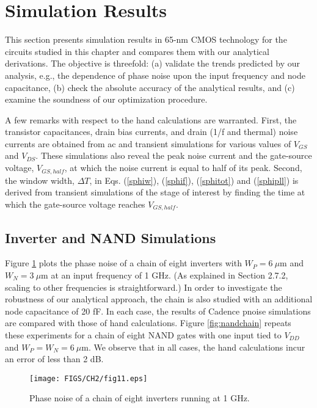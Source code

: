 \section{Simulation Results}
This section presents simulation results in 65-nm CMOS technology for the circuits studied in this chapter and compares them with our
analytical derivations. The objective is threefold: (a) validate the trends
predicted by our analysis, e.g., the dependence of phase noise upon the input frequency and node capacitance, (b) check the absolute accuracy
of the analytical results, and (c) examine the soundness of our optimization procedure.

A few remarks with respect to the hand calculations are warranted. First, the transistor capacitances, drain bias currents, and drain (1/f and
thermal) noise currents are obtained from ac and transient simulations for various values of $V_{GS}$ and $V_{DS}$. These simulations also reveal the peak
noise current and the gate-source voltage, $V_{GS,half}$, at which the noise current is equal to half of its peak. Second, the window width,
$\Delta T$, in Eqs. (\ref{sphiw}), (\ref{sphif}), (\ref{sphitot}) and (\ref{sphipll}) is derived from transient simulations of the stage of interest by finding the time at
which the gate-source voltage reaches $V_{GS,half}$.

\subsection{Inverter and NAND Simulations}
Figure \ref{fig:inverterchain} plots the phase noise of a chain of eight inverters with $W_P=6\ \mu$m and $W_N=3\ \mu$m at an input frequency of 1 GHz. (As
explained in Section 2.7.2, scaling to other frequencies is straightforward.) In
order to investigate the robustness of our analytical approach, the chain is also studied with an additional node capacitance of 20
fF. In each case, the results of Cadence pnoise simulations are compared with those of hand calculations. Figure \ref{fig:nandchain} repeats these
experiments for a chain of eight NAND gates with one input tied to $V_{DD}$ and $W_P=W_N=6\ \mu$m. We observe
that in all cases, the hand calculations incur an error of less than 2 dB.

\begin{figure}[htb!]
\centering
\texttt{[image: FIGS/CH2/fig11.eps]}
\caption{Phase noise of a chain of eight inverters running at 1 GHz.}
\label{fig:inverterchain}
\end{figure} 

